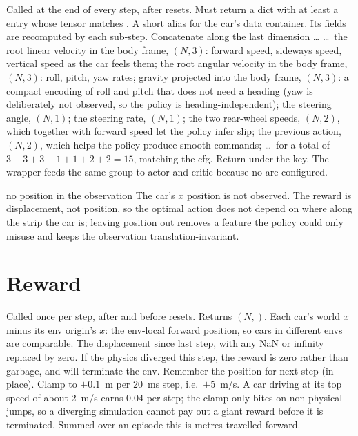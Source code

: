 \begin{explain}
 Called at the end of every step, after resets. Must return a dict
  with at least a  entry whose tensor matches
  .
 A short alias for the car's data container. Its fields are
  recomputed by  each sub-step.
 Concatenate along the last dimension \ldots
{} \ldots\ the root linear velocity in the body frame, $(N,3)$: forward
  speed, sideways speed, vertical speed as the car feels them;
 the root angular velocity in the body frame, $(N,3)$: roll, pitch,
  yaw rates;
 gravity projected into the body frame, $(N,3)$: a compact encoding
  of roll and pitch that does not need a heading (yaw is deliberately not
  observed, so the policy is heading-independent);
 the steering angle, $(N,1)$;
 the steering rate, $(N,1)$;
 the two rear-wheel speeds, $(N,2)$, which together with forward
  speed let the policy infer slip;
 the previous action, $(N,2)$, which helps the policy produce smooth
  commands;
 \ldots\ for a total of $3+3+3+1+1+2+2 = 15$, matching the cfg.
 Return under the  key. The  wrapper
  feeds the same group to actor and critic because no  are
  configured.
\end{explain}

\begin{whybox}{no position in the observation}
The car's $x$ position is not observed. The reward is displacement, not
position, so the optimal action does not depend on where along the strip the
car is; leaving position out removes a feature the policy could only misuse
and keeps the observation translation-invariant.
\end{whybox}

\section{Reward}


\begin{explain}
 Called once per step, after  and before resets.
  Returns $(N,)$.
 Each car's world $x$ minus its env origin's $x$: the env-local
  forward position, so cars in different envs are comparable.
 The displacement since last step, with any NaN or infinity replaced
  by zero. If the physics diverged this step, the reward is zero rather than
  garbage, and  will terminate the env.
 Remember the position for next step (in place).
 Clamp to $\pm0.1$~m per 20~ms step, i.e.\ $\pm5$~m/s. A car
  driving at its top speed of about 2~m/s earns 0.04 per step; the clamp
  only bites on non-physical jumps, so a diverging simulation cannot pay
  out a giant reward before it is terminated. Summed over an episode this
  is metres travelled forward.
\end{explain}

